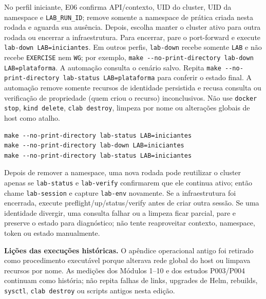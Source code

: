 \documentclass[12pt,openany,oneside,a4paper,chapter=TITLE,english,brazil]{abntex2}
\begin{document}
\begin{apendicesenv}
No perfil iniciante, E06 confirma API/contexto, UID do cluster, UID da namespace
e \texttt{LAB\_\allowbreak{}RUN\_\allowbreak{}ID}; remove somente a namespace de prática criada nesta rodada e
aguarda sua ausência. Depois, escolha manter o cluster ativo para outra rodada
ou encerrar a infraestrutura. Para encerrar, pare o port-forward e execute
\texttt{lab-{}\allowbreak{}down LAB=\allowbreak{}iniciantes}. Em outros perfis, \texttt{lab-{}\allowbreak{}down} recebe somente \texttt{LAB} e não recebe
\texttt{EXERCISE} nem \texttt{WG}; por exemplo, \texttt{make -{}\allowbreak{}-{}\allowbreak{}no-{}\allowbreak{}print-{}\allowbreak{}directory lab-{}\allowbreak{}down LAB=\allowbreak{}plataforma}.
A automação consulta o cenário salvo. Repita \texttt{make -{}\allowbreak{}-{}\allowbreak{}no-{}\allowbreak{}print-{}\allowbreak{}directory lab-{}\allowbreak{}status LAB=\allowbreak{}plataforma}
para conferir o estado final. A automação remove somente recursos
de identidade persistida e recusa consulta ou verificação de propriedade (quem criou o recurso) inconclusivos. Não use
\texttt{docker stop}, \texttt{kind delete}, \texttt{clab destroy}, limpeza por nome ou alterações
globais de host como atalho.

\begin{verbatim}
make --no-print-directory lab-status LAB=iniciantes
make --no-print-directory lab-down LAB=iniciantes
make --no-print-directory lab-status LAB=iniciantes
\end{verbatim}

Depois de remover a namespace, uma nova rodada pode reutilizar o cluster apenas
se \texttt{lab-{}\allowbreak{}status} e \texttt{lab-{}\allowbreak{}verify} confirmarem que ele continua ativo; então chame
\texttt{lab-{}\allowbreak{}session} e capture \texttt{lab-{}\allowbreak{}env} novamente. Se a infraestrutura foi encerrada,
execute preflight/up/status/verify antes de criar outra sessão. Se uma identidade
divergir, uma consulta falhar ou a limpeza ficar parcial, pare e preserve o
estado para diagnóstico; não tente reaproveitar contexto, namespace, token ou
estado manualmente.

\textbf{Lições das execuções históricas.} O apêndice operacional antigo foi retirado
como procedimento executável porque alterava rede global do host ou limpava
recursos por nome. As medições dos Módulos 1--10 e dos estudos P003/P004
continuam como história; não repita falhas de links, upgrades de Helm,
rebuilds, \texttt{sysctl}, \texttt{clab destroy} ou scripts antigos nesta edição.


\end{apendicesenv}
\end{document}
